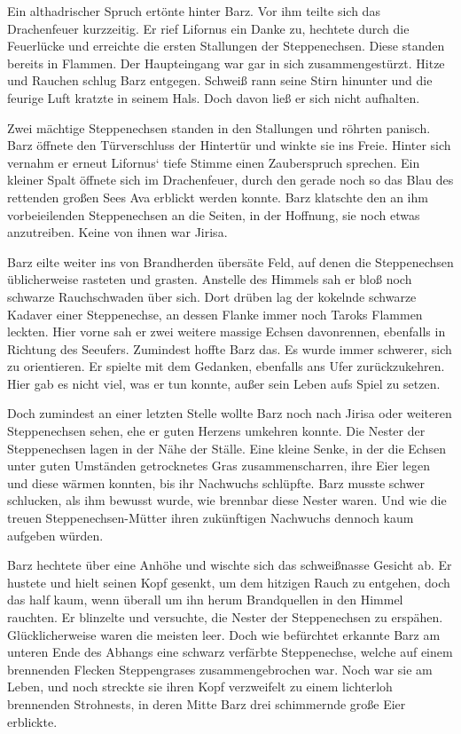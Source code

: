 Ein althadrischer Spruch ertönte hinter Barz. Vor ihm teilte sich das Drachenfeuer kurzzeitig. Er rief Lifornus ein Danke zu, hechtete durch die Feuerlücke und erreichte die ersten Stallungen der Steppenechsen. Diese standen bereits in Flammen. Der Haupteingang war gar in sich zusammengestürzt. Hitze und Rauchen schlug Barz entgegen. Schweiß rann seine Stirn hinunter und die feurige Luft kratzte in seinem Hals. Doch davon ließ er sich nicht aufhalten.

Zwei mächtige Steppenechsen standen in den Stallungen und röhrten panisch. Barz öffnete den Türverschluss der Hintertür und winkte sie ins Freie. Hinter sich vernahm er erneut Lifornus‘ tiefe Stimme einen Zauberspruch sprechen. Ein kleiner Spalt öffnete sich im Drachenfeuer, durch den gerade noch so das Blau des rettenden großen Sees Ava erblickt werden konnte. Barz klatschte den an ihm vorbeieilenden Steppenechsen an die Seiten, in der Hoffnung, sie noch etwas anzutreiben. Keine von ihnen war Jirisa.

Barz eilte weiter ins von Brandherden übersäte Feld, auf denen die Steppenechsen üblicherweise rasteten und grasten. Anstelle des Himmels sah er bloß noch schwarze Rauchschwaden über sich. Dort drüben lag der kokelnde schwarze Kadaver einer Steppenechse, an dessen Flanke immer noch Taroks Flammen leckten. Hier vorne sah er zwei weitere massige Echsen davonrennen, ebenfalls in Richtung des Seeufers. Zumindest hoffte Barz das. Es wurde immer schwerer, sich zu orientieren. Er spielte mit dem Gedanken, ebenfalls ans Ufer zurückzukehren. Hier gab es nicht viel, was er tun konnte, außer sein Leben aufs Spiel zu setzen.

Doch zumindest an einer letzten Stelle wollte Barz noch nach Jirisa oder weiteren Steppenechsen sehen, ehe er guten Herzens umkehren konnte. Die Nester der Steppenechsen lagen in der Nähe der Ställe. Eine kleine Senke, in der die Echsen unter guten Umständen getrocknetes Gras zusammenscharren, ihre Eier legen und diese wärmen konnten, bis ihr Nachwuchs schlüpfte. Barz musste schwer schlucken, als ihm bewusst wurde, wie brennbar diese Nester waren. Und wie die treuen Steppenechsen-Mütter ihren zukünftigen Nachwuchs dennoch kaum aufgeben würden.

Barz hechtete über eine Anhöhe und wischte sich das schweißnasse Gesicht ab. Er hustete und hielt seinen Kopf gesenkt, um dem hitzigen Rauch zu entgehen, doch das half kaum, wenn überall um ihn herum Brandquellen in den Himmel rauchten. Er blinzelte und versuchte, die Nester der Steppenechsen zu erspähen. Glücklicherweise waren die meisten leer. Doch wie befürchtet erkannte Barz am unteren Ende des Abhangs eine schwarz verfärbte Steppenechse, welche auf einem brennenden Flecken Steppengrases zusammengebrochen war. Noch war sie am Leben, und noch streckte sie ihren Kopf verzweifelt zu einem lichterloh brennenden Strohnests, in deren Mitte Barz drei schimmernde große Eier erblickte.

